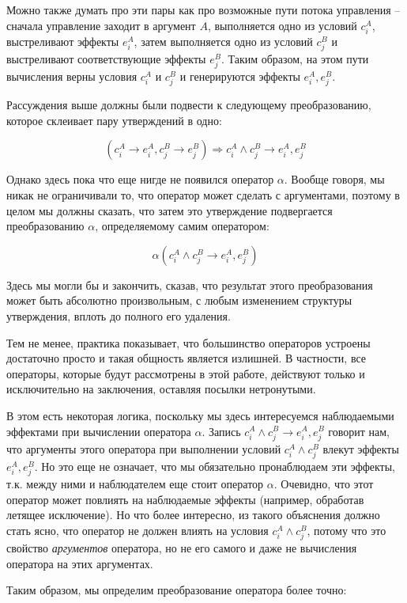 Можно также думать про эти пары как про возможные пути потока управления -- сначала управление заходит в аргумент $A$, выполняется одно из условий $c^A_i$, выстреливают эффекты $e^A_i$, затем выполняется одно из условий $c^B_j$ и выстреливают соответствующие эффекты $e^B_j$. Таким образом, на этом пути вычисления верны условия $c^A_i$ и $c^B_j$ и генерируются эффекты $e^A_i, e^B_j$.

Рассуждения выше должны были подвести к следующему преобразованию, которое склеивает пару утверждений в одно:

$$ (c^A_i \rightarrow e^A_i, c^B_j \rightarrow e^B_j) \Rightarrow c^A_i \land c^B_j \rightarrow e^A_i, e^B_j $$

Однако здесь пока что еще нигде не появился оператор $\alpha$. Вообще говоря, мы никак не ограничивали то, что оператор может сделать с аргументами, поэтому в целом мы должны сказать, что затем это утверждение подвергается преобразованию $\alpha$, определяемому самим оператором:

$$ \alpha(c^A_i \land c^B_j \rightarrow e^A_i, e^B_j) $$ 

Здесь мы могли бы и закончить, сказав, что результат этого преобразования может быть абсолютно произвольным, с любым изменением структуры утверждения, вплоть до полного его удаления.

Тем не менее, практика показывает, что большинство операторов устроены достаточно просто и такая общность является излишней. В частности, все операторы, которые будут рассмотрены в этой работе, действуют только и исключительно на заключения, оставляя посылки нетронутыми.

В этом есть некоторая логика, поскольку мы здесь интересуемся наблюдаемыми эффектами при вычислении оператора $\alpha$. Запись $c^A_i \land c^B_j \rightarrow e^A_i, e^B_j$ говорит нам, что аргументы этого оператора при выполнении условий $c^A_i \land c^B_j$ влекут эффекты $e^A_i, e^B_j$. Но это еще не означает, что мы обязательно пронаблюдаем эти эффекты, т.к. между ними и наблюдателем еще стоит оператор $\alpha$. Очевидно, что этот оператор может повлиять на наблюдаемые эффекты (например, обработав летящее исключение). Но что более интересно, из такого объяснения должно стать ясно, что оператор не должен влиять на условия $c^A_i \land c^B_j$, потому что это свойство \emph{аргументов} оператора, но не его самого и даже не вычисления оператора на этих аргументах.

Таким образом, мы определим преобразование оператора более точно:

